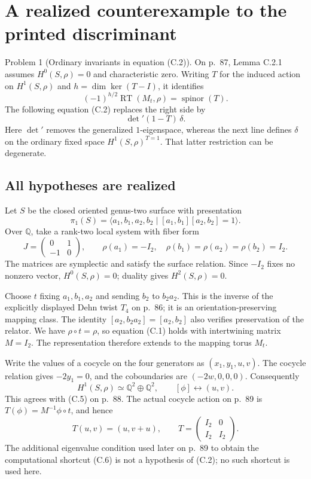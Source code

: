 \documentclass[10pt]{article}
\begin{document}
\section*{A realized counterexample to the printed discriminant}
Problem 1 (Ordinary invariants in equation (C.2)).  On p. 87, Lemma C.2.1 assumes \(H^0(S,\rho)=0\) and characteristic zero. Writing \(T\) for the induced action on \(H^1(S,\rho)\) and \(h=\dim\ker(T-I)\), it identifies \[(-1)^{h/2}\operatorname{RT}(M_t,\rho)=\operatorname{spinor}(T).\] The following equation (C.2) replaces the right side by \[\det{}'(1-T)\,\delta.\] Here \(\det{}'\) removes the generalized \(1\)-eigenspace, whereas the next line defines \(\delta\) on the ordinary fixed space \(H^1(S,\rho)^{T=1}\). That latter restriction can be degenerate.\par
\subsection*{All hypotheses are realized}
Let \(S\) be the closed oriented genus-two surface with presentation \[\pi_1(S)=\langle a_1,b_1,a_2,b_2\mid[a_1,b_1][a_2,b_2]=1\rangle.\] Over \(\mathbb Q\), take a rank-two local system with fiber form \[J=\begin{pmatrix}0&1\\-1&0\end{pmatrix},\qquad
 \rho(a_1)=-I_2,\quad \rho(b_1)=\rho(a_2)=\rho(b_2)=I_2.\] The matrices are symplectic and satisfy the surface relation. Since \(-I_2\) fixes no nonzero vector, \(H^0(S,\rho)=0\); duality gives \(H^2(S,\rho)=0\).\par
Choose \(t\) fixing \(a_1,b_1,a_2\) and sending \(b_2\) to \(b_2a_2\). This is the inverse of the explicitly displayed Dehn twist \(T_4\) on p. 86; it is an orientation-preserving mapping class. The identity \([a_2,b_2a_2]=[a_2,b_2]\) also verifies preservation of the relator. We have \(\rho\circ t=\rho\), so equation (C.1) holds with intertwining matrix \(M=I_2\). The representation therefore extends to the mapping torus \(M_t\).\par
Write the values of a cocycle on the four generators as \((x_1,y_1,u,v)\). The cocycle relation gives \(-2y_1=0\), and the coboundaries are \((-2w,0,0,0)\). Consequently \[H^1(S,\rho)\simeq\mathbb Q^2\oplus\mathbb Q^2,\qquad [\phi]\longleftrightarrow(u,v).\] This agrees with (C.5) on p. 88. The actual cocycle action on p. 89 is \(T(\phi)=M^{-1}\phi\circ t\), and hence \[T(u,v)=(u,v+u),\qquad
 T=\begin{pmatrix}I_2&0\\ I_2&I_2\end{pmatrix}.\] The additional eigenvalue condition used later on p. 89 to obtain the computational shortcut (C.6) is not a hypothesis of (C.2); no such shortcut is used here.\par
\end{document}

